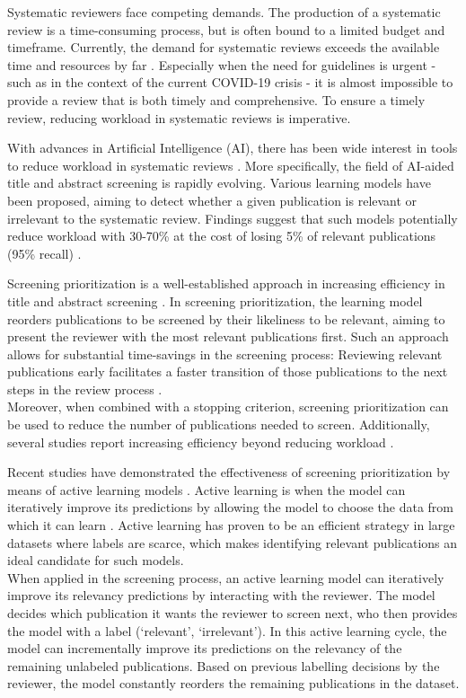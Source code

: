 \documentclass[
]{article}
\begin{document}
Systematic reviewers face competing demands. The production of a
systematic review is a time-consuming process, but is often bound to a
limited budget and timeframe. Currently, the demand for systematic
reviews exceeds the available time and resources by far
\autocite{Lau2019}. Especially when the need for guidelines is urgent -
such as in the context of the current COVID-19 crisis - it is almost
impossible to provide a review that is both timely and comprehensive. To
ensure a timely review, reducing workload in systematic reviews is
imperative.

With advances in Artificial Intelligence (AI), there has been wide
interest in tools to reduce workload in systematic reviews
\autocite{Harrison2020}. More specifically, the field of AI-aided title
and abstract screening is rapidly evolving. Various learning models have
been proposed, aiming to detect whether a given publication is relevant
or irrelevant to the systematic review. Findings suggest that such
models potentially reduce workload with 30-70\% at the cost of losing
5\% of relevant publications (95\% recall) \autocite{OMara-Eves2015}.

Screening prioritization is a well-established approach in increasing
efficiency in title and abstract screening
\autocite{Cohen2009,Shemilt2014}. In screening prioritization, the
learning model reorders publications to be screened by their likeliness
to be relevant, aiming to present the reviewer with the most relevant
publications first. Such an approach allows for substantial time-savings
in the screening process: Reviewing relevant publications early
facilitates a faster transition of those publications to the next steps
in the review process \autocite{Cohen2009}.\\
Moreover, when combined with a stopping criterion, screening
prioritization can be used to reduce the number of publications needed
to screen. Additionally, several studies report increasing efficiency
beyond reducing workload \autocite{OMara-Eves2015}.

Recent studies have demonstrated the effectiveness of screening
prioritization by means of active learning models
\autocite{Yu2019,Yu2018,Miwa2014}. Active learning is when the model can
iteratively improve its predictions by allowing the model to choose the
data from which it can learn \autocite{Settles2012}. Active learning has
proven to be an efficient strategy in large datasets where labels are
scarce, which makes identifying relevant publications an ideal candidate
for such models.\\
When applied in the screening process, an active learning model can
iteratively improve its relevancy predictions by interacting with the
reviewer. The model decides which publication it wants the reviewer to
screen next, who then provides the model with a label (`relevant',
`irrelevant'). In this active learning cycle, the model can
incrementally improve its predictions on the relevancy of the remaining
unlabeled publications. Based on previous labelling decisions by the
reviewer, the model constantly reorders the remaining publications in
the dataset.
\end{document}
